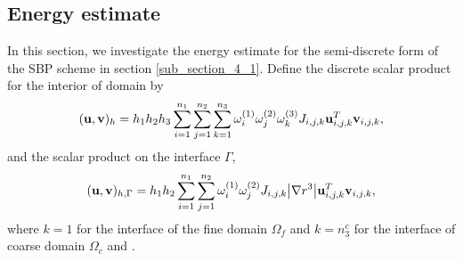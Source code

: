 \documentclass[a4paper]{article}
\begin{document}
\subsection{Energy estimate}


In this section, we investigate the energy estimate for the semi-discrete form of the SBP scheme in section \ref{sub_section_4_1}. Define the discrete scalar product for the interior of domain by
\begin{equation*}
({\bf u}, {\bf v})_h = h_1h_2h_3\sum_{i=1}^{n_1}\sum_{j=1}^{n_2}\sum_{k=1}^{n_3}\omega_i^{(1)}\omega_j^{(2)}\omega_k^{(3)}J_{i,j,k}{\bf u}^{T}_{i,j,k}{\bf v}_{i,j,k},
\end{equation*}
and the scalar product on the interface $\Gamma$,
\begin{equation*}
({\bf u}, {\bf v})_{h,\Gamma} = h_1h_2\sum_{i=1}^{n_1}\sum_{j=1}^{n_2}\omega_i^{(1)}\omega_j^{(2)}J_{i,j,k}\big|\nabla r^{3}\big|{\bf u}_{i,j,k}^{T}{\bf v}_{i,j,k},
\end{equation*}
where $k = 1$ for the interface of the fine domain $\Omega_f$ and $k = n_3^c$ for the interface of coarse domain $\Omega_c$ and .
\end{document}
